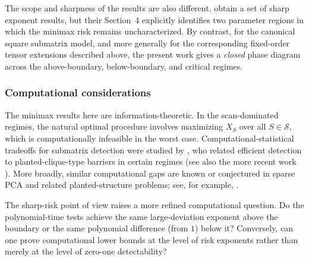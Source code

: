 \documentclass[11pt,reqno,letterpaper]{amsart}
\numberwithin{equation}{section}
\theoremstyle{plain}
\begin{document}
The scope and sharpness of the results are also different. \cite{mukherjee2020minimax} 
obtain a set of sharp exponent results, but their Section~4 explicitly identifies two
parameter regions in which the minimax risk remains uncharacterized. By
contrast, for the canonical square submatrix model, and more generally for the
corresponding fixed-order tensor extensions described above, the present work
gives a {\em closed} phase diagram across the above-boundary, below-boundary, and
critical regimes. %

\subsubsection{Computational considerations}
The minimax results here are information-theoretic.  In the scan-dominated regimes, the natural optimal procedure involves maximizing $X_S$ over all $S\in\mathcal S$, which is computationally infeasible in the worst case.  Computational-statistical tradeoffs for submatrix detection were studied by \cite{ma2015computational}, who related efficient detection to planted-clique-type barriers in certain regimes (see also the more recent work \cite{MR4928482}).  More broadly, similar computational gaps are known or conjectured in sparse PCA and related planted-structure problems; see, for example, \cite{berthet2013complexity}.

The sharp-risk point of view raises a more refined computational question. Do the polynomial-time tests achieve the same large-deviation exponent above the boundary or the same polynomial difference (from $1$) below it? Conversely, can one prove computational lower bounds at the level of risk exponents rather than merely at the level of zero-one detectability? 
\end{document}
